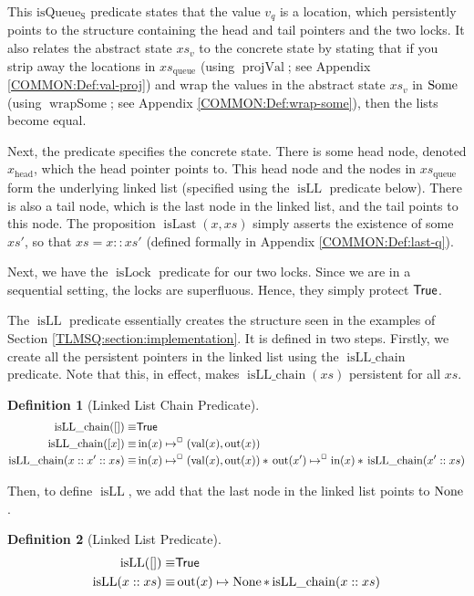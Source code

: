 \documentclass[a4paper, 10pt]{report}
\theoremstyle{definition}
\newtheorem{definition}{Definition}[section]
\newcommand{\isLock}{\operatorname{isLock}}
\newcommand{\isqueueseq}{\operatorname{isQueue_{S}}}
\newcommand{\vq}{v_q}
\newcommand{\xsc}{xs}
\newcommand{\xsqueue}{xs_{\mathrm{queue}}}
\newcommand{\isLLchain}{\operatorname{isLL\_chain}}
\newcommand{\isLL}{\operatorname{isLL}}
\newcommand{\projval}{\operatorname{projVal}}
\newcommand{\wrapsome}{\operatorname{wrapSome}}
\newcommand{\isLast}{\operatorname{isLast}}
\newcommand{\nIn}[1]{\operatorname{in}(#1)}
\newcommand{\nVal}[1]{\operatorname{val}(#1)}
\newcommand{\nOut}[1]{\operatorname{out}(#1)}
\newcommand{\node}{x}
\newcommand{\nodeN}[1]{\node_{\mathrm{#1}}}
\newcommand{\nodehead}{\nodeN{head}}
\newcommand{\absvalueList}{xs_v}
\newcommand{\isNode}[1]{\nIn{#1} \mapsto^{\persistently} (\nVal{#1}, \nOut{#1})}
\begin{document}
This $\isqueueseq$ predicate states that the value $\vq$ is a location, which persistently points to the structure containing the head and tail pointers and the two locks. It also relates the abstract state $\absvalueList$ to the concrete state by stating that if you strip away the locations in $\xsqueue$ (using $\projval$; see Appendix \ref{COMMON:Def:val-proj}) and wrap the values in the abstract state $\absvalueList$ in $\operatorname{Some}$ (using $\wrapsome$; see Appendix \ref{COMMON:Def:wrap-some}), then the lists become equal.

Next, the predicate specifies the concrete state. There is some head node, denoted $\nodehead$, which the head pointer points to. This head node and the nodes in $\xsqueue$ form the underlying linked list (specified using the $\isLL$ predicate below). There is also a tail node, which is the last node in the linked list, and the tail points to this node. The proposition $\isLast(\node, \xsc)$ simply asserts the existence of some $\xsc'$, so that $\xsc = \node :: \xsc'$ (defined formally in Appendix \ref{COMMON:Def:last-q}).

Next, we have the $\isLock$ predicate for our two locks. Since we are in a sequential setting, the locks are superfluous. Hence, they simply protect $\textsf{True}$.

The $\isLL$ predicate essentially creates the structure seen in the examples of Section \ref{TLMSQ:section:implementation}. It is defined in two steps. Firstly, we create all the persistent pointers in the linked list using the $\isLLchain$ predicate. Note that this, in effect, makes $\isLLchain(\xsc)$ persistent for all $\xsc$.
\begin{definition}[Linked List Chain Predicate]
  \begin{align*}
    \isLLchain([]) \equiv& \TRUE\\
    \isLLchain([\node]) \equiv& \isNode{\node}\\
    \isLLchain(\node :: \node' :: \xsc) \equiv& \isNode{\node} \star{} \nOut{\node'} \mapsto^{\persistently} \nIn{\node} \star{} \isLLchain(\node' :: \xsc)
  \end{align*}
\end{definition}

Then, to define $\isLL$, we add that the last node in the linked list points to $\operatorname{None}$.
\begin{definition}[Linked List Predicate]
  \begin{align*}
    \isLL([]) \equiv& \TRUE\\
    \isLL(\node :: \xsc) \equiv& \nOut{\node} \mapsto \None \star{} \isLLchain(\node :: \xsc)
  \end{align*}
\end{definition}
\end{document}
